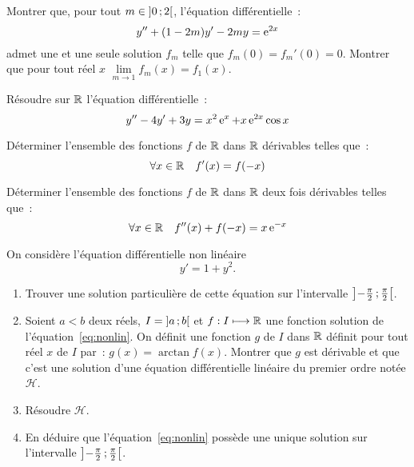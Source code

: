 \begin{exercice}
    Montrer que, pour tout \(m \in \left] 0 \, ;  2 \right[\), l'équation différentielle~:
    \begin{equation}
        y'' + (1-2m)y' - 2my = \operatorname{e}^{2x}
    \end{equation}
    admet une et une seule solution \(f_m\) telle que \(f_m(0)=f_m'(0)=0\). Montrer que pour tout réel \(x\) \(\lim\limits_{m \to 1} f_m(x) = f_1(x)\).
\end{exercice}
\begin{exercice}
    Résoudre sur \(\mathbb{R}\) l'équation différentielle~:
    \begin{equation}
        y'' - 4y' + 3y = x^2\operatorname{e}^x + x\operatorname{e}^{2x}\cos x
    \end{equation}
\end{exercice}
\begin{exercice}
    Déterminer l'ensemble des fonctions \(f\) de \(\mathbb{R}\) dans \(\mathbb{R}\) dérivables telles que~:
    \begin{equation}
        \forall x \in \mathbb{R} \quad f'(x) = f(-x)
    \end{equation}
\end{exercice}
\begin{exercice}
    Déterminer l'ensemble des fonctions \(f\) de \(\mathbb{R}\) dans \(\mathbb{R}\) deux fois dérivables telles que~:
    \begin{equation}
        \forall x \in \mathbb{R} \quad f''(x) + f(-x) = x\operatorname{e}^{-x}
    \end{equation}
\end{exercice}
\begin{exercice}
    On considère l'équation différentielle non linéaire 
    \begin{equation}
        \label{eq:nonlin}
        y' = 1 + y^2.
    \end{equation}
    \begin{enumerate}
        \item Trouver une solution particulière de cette équation sur l'intervalle \(\left] -\frac{\pi}{2} \, ;  \frac{\pi}{2} \right[\).
        \item Soient \(a<b\) deux réels, \(I = \left] a \, ;  b \right[\) et \(f : I \longmapsto \mathbb{R}\) une fonction solution de l'équation~\eqref{eq:nonlin}. On définit une fonction \(g\) de \(I\) dans \(\mathbb{R}\) définit pour tout réel \(x\) de \(I\) par~: \(g(x) = \arctan f(x) \). Montrer que \(g\) est dérivable et que c'est une solution d'une équation différentielle linéaire du premier ordre notée \(\mathcal{H}\).
        \item Résoudre \(\mathcal{H}\).
        \item En déduire que l'équation~\eqref{eq:nonlin} possède une unique solution sur l'intervalle \(\left] -\frac{\pi}{2} \, ;  \frac{\pi}{2} \right[\).
    \end{enumerate}
\end{exercice}
